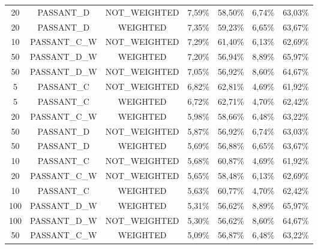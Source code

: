 \begin{table}[H]
{\begin{tabular}{ccccccc}
	20 &  PASSANT\_D & NOT\_WEIGHTED &     7,59\% &    58,50\% &     6,74\% &    63,03\% \\
	
	20 &  PASSANT\_D &   WEIGHTED &     7,35\% &    59,23\% &     6,65\% &    63,67\% \\
	
	10 & PASSANT\_C\_W & NOT\_WEIGHTED &     7,29\% &    61,40\% &     6,13\% &    62,69\% \\
	
	50 & PASSANT\_D\_W &   WEIGHTED &     7,20\% &    56,94\% &     8,89\% &    65,97\% \\
	
	50 & PASSANT\_D\_W & NOT\_WEIGHTED &     7,05\% &    56,92\% &     8,60\% &    64,67\% \\
	
	5 &  PASSANT\_C & NOT\_WEIGHTED &     6,82\% &    62,81\% &     4,69\% &    61,92\% \\
	
	5 &  PASSANT\_C &   WEIGHTED &     6,72\% &    62,71\% &     4,70\% &    62,42\% \\
	
	20 & PASSANT\_C\_W &   WEIGHTED &     5,98\% &    58,66\% &     6,48\% &    63,22\% \\
	
	50 &  PASSANT\_D & NOT\_WEIGHTED &     5,87\% &    56,92\% &     6,74\% &    63,03\% \\
	
	50 &  PASSANT\_D &   WEIGHTED &     5,69\% &    56,88\% &     6,65\% &    63,67\% \\
	
	10 &  PASSANT\_C & NOT\_WEIGHTED &     5,68\% &    60,87\% &     4,69\% &    61,92\% \\
	
	20 & PASSANT\_C\_W & NOT\_WEIGHTED &     5,65\% &    58,48\% &     6,13\% &    62,69\% \\
	
	10 &  PASSANT\_C &   WEIGHTED &     5,63\% &    60,77\% &     4,70\% &    62,42\% \\
	
	100 & PASSANT\_D\_W &   WEIGHTED &     5,31\% &    56,62\% &     8,89\% &    65,97\% \\
	
	100 & PASSANT\_D\_W & NOT\_WEIGHTED &     5,30\% &    56,62\% &     8,60\% &    64,67\% \\
	
	50 & PASSANT\_C\_W &   WEIGHTED &     5,09\% &    56,87\% &     6,48\% &    63,22\% \\
	

\end{tabular}}
\end{table}
